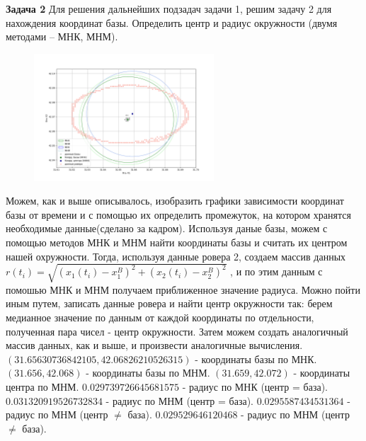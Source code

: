 \documentclass[a4paper,12pt]{article}
\begin{document}
\textbf{Задача 2}
Для решения дальнейших подзадач задачи 1, решим задачу 2 для нахождения координат базы.
Определить центр и радиус окружности (двумя методами – МНК, МНМ).\newline
\begin{figure}
    \includegraphics[width=0.6\textwidth]{Figure_4.png}
\end{figure}
Можем, как и выше описывалось, изобразить графики зависимости координат базы от времени и с помощью их определить промежуток, на котором хранятся необходимые данные(сделано за кадром). Используя даные базы, можем с помощью методов МНК и МНМ найти координаты базы и считать их центром нашей охружности. Тогда, используя данные ровера 2, создаем массив данных $r(t_i)=\sqrt{(x_1(t_i)-x_1^B)^2+(x_2(t_i)-x_2^B)^2}$ , и по этим данным с помошью МНК и МНМ получаем приближенное значение радиуса.
\newline
Можно пойти иным путем, записать данные ровера и найти центр окружности так: берем медианное значение по данным от каждой координаты по отдельности, полученная пара чисел - центр окружности. Затем можем создать аналогичный массив данных, как и выше, и произвести аналогичные вычисления.
\newline
$( 31.65630736842105 , 42.06826210526315 )$ - координаты базы по МНК.\newline
$( 31.656 , 42.068 )$ - координаты базы по МНМ.\newline
$( 31.659 , 42.072 )$ - координаты центра по МНМ.\newline
$0.029739726645681575$ - радиус по МНК (центр = база). \newline
$0.031320919526732834$ - радиус по МНМ (центр = база). \newline
$0.0295587434531364$ - радиус по МНМ (центр $\neq$ база).\newline
$0.029529646120468$ - радиус по МНМ (центр $\neq$ база).\newline
\end{document}
